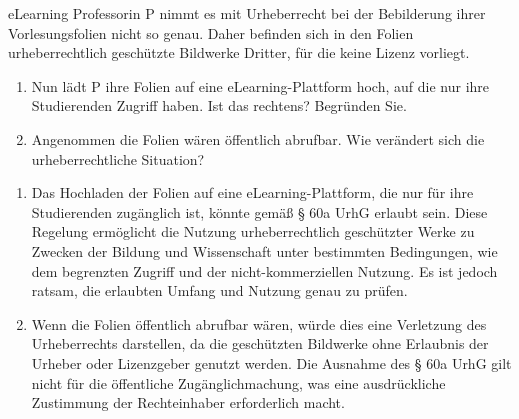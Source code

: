 \documentclass{article}
\begin{document}
\begin{exercise}{eLearning}
  Professorin P nimmt es mit Urheberrecht bei der Bebilderung ihrer Vorlesungsfolien nicht so genau. Daher befinden sich in den Folien urheberrechtlich geschützte Bildwerke Dritter, für die keine Lizenz vorliegt.
  \begin{enumerate}
    \item Nun lädt P ihre Folien auf eine eLearning-Plattform hoch, auf die nur ihre Studierenden Zugriff haben. Ist das rechtens? Begründen Sie.
    \item Angenommen die Folien wären öffentlich abrufbar. Wie verändert sich die urheberrechtliche Situation?
  \end{enumerate}

  \begin{solution}
    \begin{enumerate}
      \item Das Hochladen der Folien auf eine eLearning-Plattform, die nur für ihre Studierenden zugänglich ist, könnte gemäß § 60a UrhG erlaubt sein. Diese Regelung ermöglicht die Nutzung urheberrechtlich geschützter Werke zu Zwecken der Bildung und Wissenschaft unter bestimmten Bedingungen, wie dem begrenzten Zugriff und der nicht-kommerziellen Nutzung. Es ist jedoch ratsam, die erlaubten Umfang und Nutzung genau zu prüfen.
      \item Wenn die Folien öffentlich abrufbar wären, würde dies eine Verletzung des Urheberrechts darstellen, da die geschützten Bildwerke ohne Erlaubnis der Urheber oder Lizenzgeber genutzt werden. Die Ausnahme des § 60a UrhG gilt nicht für die öffentliche Zugänglichmachung, was eine ausdrückliche Zustimmung der Rechteinhaber erforderlich macht.
    \end{enumerate}
  \end{solution}
\end{exercise}
\end{document}

